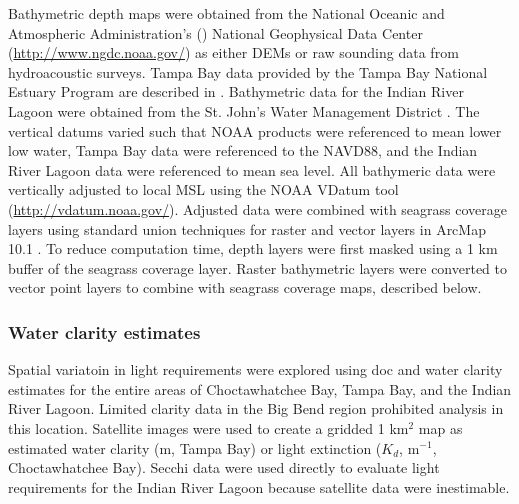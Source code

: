 \documentclass[letterpaper,12pt,oneside]{article}\usepackage[]{graphicx}\usepackage[]{color}
\begin{document}
Bathymetric depth maps were obtained from the National Oceanic and Atmospheric Administration's () National Geophysical Data Center (\url{http://www.ngdc.noaa.gov/}) as either \acp{DEM} or raw sounding data from hydroacoustic surveys.  Tampa Bay data provided by the Tampa Bay National Estuary Program are described in \citet{Tyler07}. Bathymetric data for the Indian River Lagoon were obtained from the St. John's Water Management District \citep{CPE97}.  The vertical datums varied such that \ac{NOAA} products were referenced to mean lower low water, Tampa Bay data were referenced to the \ac{NAVD88}, and the Indian River Lagoon data were referenced to mean sea level.  All bathymeric data were vertically adjusted to local \ac{MSL} using the \ac{NOAA} VDatum tool (\url{http://vdatum.noaa.gov/}). Adjusted data were combined with seagrass coverage layers using standard union techniques for raster and vector layers in ArcMap 10.1 \citep{ESRI12}.  To reduce computation time, depth layers were first masked using a 1 km buffer of the seagrass coverage layer.  Raster bathymetric layers were converted to vector point layers to combine with seagrass coverage maps, described below.  

\subsubsection{Water clarity estimates} \label{sec:clar_est}

Spatial variatoin in light requirements were explored using \ac{doc} and water clarity estimates for the entire areas of Choctawhatchee Bay, Tampa Bay, and the Indian River Lagoon. Limited clarity data in the Big Bend region prohibited analysis in this location.  Satellite images were used to create a gridded 1 km$^2$ map as estimated water clarity (m, Tampa Bay) or light extinction ($K_d$, m$^{-1}$, Choctawhatchee Bay).  Secchi data were used directly to evaluate light requirements for the Indian River Lagoon because satellite data were inestimable.
\end{document}
